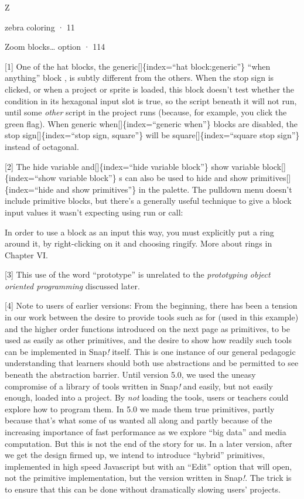 \documentclass[
  letterpaper,
]{book}
\begin{document}
Z

zebra coloring · 11

Zoom blocks\ldots{} option · 114

{[}1{]} One of the hat blocks, the generic{[}{]}\{index=``hat
block:generic''\} ``when anything'' block , is subtly different from the
others. When the stop sign is clicked, or when a project or sprite is
loaded, this block doesn't test whether the condition in its hexagonal
input slot is true, so the script beneath it will not run, until some
\emph{other} script in the project runs (because, for example, you click
the green flag). When generic when{[}{]}\{index=``generic when''\}
blocks are disabled, the stop sign{[}{]}\{index=``stop sign, square''\}
will be square{[}{]}\{index=``square stop sign''\} instead of octagonal.

{[}2{]} The hide variable and{[}{]}\{index=``hide variable block''\}
show variable block{[}{]}\{index=``show variable block''\} s can also be
used to hide and show primitives{[}{]}\{index=``hide and show
primitives''\} in the palette. The pulldown menu doesn't include
primitive blocks, but there's a generally useful technique to give a
block input values it wasn't expecting using run or call:

In order to use a block as an input this way, you must explicitly put a
ring around it, by right-clicking on it and choosing ringify. More about
rings in Chapter VI.

{[}3{]} This use of the word ``prototype'' is unrelated to the
\emph{prototyping object oriented programming} discussed later.

{[}4{]} Note to users of earlier versions: From the beginning, there has
been a tension in our work between the desire to provide tools such as
for (used in this example) and the higher order functions introduced on
the next page as primitives, to be used as easily as other primitives,
and the desire to show how readily such tools can be implemented in
Snap\emph{!} itself. This is one instance of our general pedagogic
understanding that learners should both use abstractions and be
permitted to see beneath the abstraction barrier. Until version 5.0, we
used the uneasy compromise of a library of tools written in Snap\emph{!}
and easily, but not easily enough, loaded into a project. By \emph{not}
loading the tools, users or teachers could explore how to program them.
In 5.0 we made them true primitives, partly because that's what some of
us wanted all along and partly because of the increasing importance of
fast performance as we explore ``big data'' and media computation. But
this is not the end of the story for us. In a later version, after we
get the design firmed up, we intend to introduce ``hybrid'' primitives,
implemented in high speed Javascript but with an ``Edit'' option that
will open, not the primitive implementation, but the version written in
Snap\emph{!}. The trick is to ensure that this can be done without
dramatically slowing users' projects.
\end{document}
